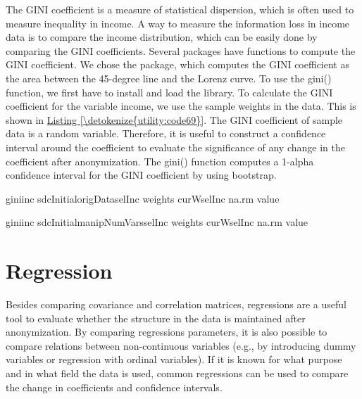 \documentclass[letterpaper,10pt,english]{sphinxmanual}
\begin{document}
The GINI coefficient is a measure of statistical dispersion, which is
often used to measure inequality in income. A way to measure the
information loss in income data is to compare the income distribution,
which can be easily done by comparing the GINI coefficients. Several 
packages have functions to compute the GINI coefficient. We chose the
 package, which computes the GINI coefficient as the area
between the 45-degree line and the Lorenz curve. To use the gini()
function, we first have to install and load the  library. To
calculate the GINI coefficient for the variable income, we use the
sample weights in the data. This is shown in \hyperref[\detokenize{utility:code69}]{Listing \ref{\detokenize{utility:code69}}}. The GINI
coefficient of sample data is a random variable. Therefore, it is useful
to construct a confidence interval around the coefficient to evaluate
the significance of any change in the coefficient after anonymization.
The gini() function computes a 1-alpha confidence interval for the GINI
coefficient by using bootstrap.

\def\sphinxLiteralBlockLabel{\label{\detokenize{utility:code69}}}
%
\begin{sphinxVerbatim}[commandchars=\\\{\},numbers=left,firstnumber=1,stepnumber=1]
giniinc  sdcInitialorigData\PYG{p}{[}selInc\PYG{p}{]}
     weights   curW\PYG{p}{[}selInc\PYG{p}{]} na.rm  value 

giniinc  sdcInitialmanipNumVars\PYG{p}{[}selInc\PYG{p}{]}
     weights  curW\PYG{p}{[}selInc\PYG{p}{]} na.rm  value 
\end{sphinxVerbatim}


\section{Regression}
\label{\detokenize{utility:regression}}
Besides comparing covariance and correlation matrices, regressions are a
useful tool to evaluate whether the structure in the data is maintained
after anonymization. By comparing regressions parameters, it is also
possible to compare relations between non-continuous variables (e.g., by
introducing dummy variables or regression with ordinal variables). If it
is known for what purpose and in what field the data is used, common
regressions can be used to compare the change in coefficients and
confidence intervals.
\end{document}
